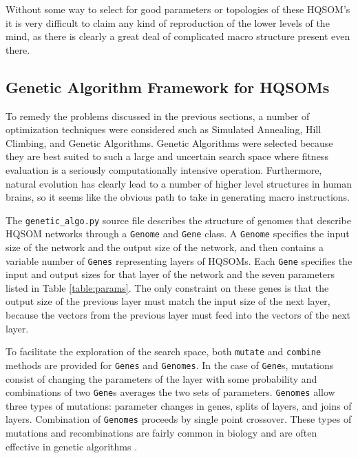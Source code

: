 \documentclass[12pt,a4paper]{article}
\begin{document}
Without some way to select for good parameters or topologies of these HQSOM's it is very difficult to claim any kind of reproduction of the lower levels of the mind, as there is clearly a great deal of complicated macro structure present even there.

\subsection{Genetic Algorithm Framework for HQSOMs}
To remedy the problems discussed in the previous sections, a number of optimization techniques were considered such as Simulated Annealing, Hill Climbing, and Genetic Algorithms.  Genetic Algorithms were selected because they are best suited to such a large and uncertain search space where fitness evaluation is a seriously computationally intensive operation.  Furthermore, natural evolution has clearly lead to a number of higher level structures in human brains, so it seems like the obvious path to take in generating macro instructions.

The \texttt{genetic\_algo.py} source file describes the structure of genomes that describe HQSOM networks through a \texttt{Genome} and \texttt{Gene} class. A \texttt{Genome} specifies the input size of the network and the output size of the network, and then contains a variable number of \texttt{Genes} representing layers of HQSOMs.  Each \texttt{Gene} specifies the input and output sizes for that layer of the network and the seven parameters listed in Table \ref{table:params}. The only constraint on these genes is that the output size of the previous layer must match the input size of the next layer, because the vectors from the previous layer must feed into the vectors of the next layer.

To facilitate the exploration of the search space, both \texttt{mutate} and \texttt{combine} methods are provided for \texttt{Genes} and \texttt{Genomes}.  In the case of \texttt{Gene}s, mutations consist of changing the parameters of the layer with some probability and combinations of two \texttt{Gene}s averages the two sets of parameters.  \texttt{Genomes} allow three types of mutations: parameter changes in genes, splits of layers, and joins of layers.  Combination of \texttt{Genomes} proceeds by single point crossover.  These types of mutations and recombinations are fairly common in biology and are often effective in genetic algorithms \cite{Inspiration}.
\end{document}
